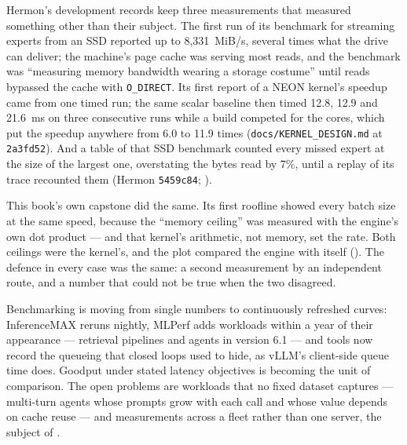 
Hermon's development records keep three measurements that measured something
other than their subject. The first run of its benchmark for streaming experts
from an SSD reported up to 8,331~MiB/s, several times what the drive can
deliver; the machine's page cache was serving most reads, and the benchmark was
``measuring memory bandwidth wearing a storage costume'' until reads bypassed the
cache with \texttt{O\_DIRECT}. Its first report of a NEON kernel's speedup came
from one timed run; the same scalar baseline then timed 12.8, 12.9 and 21.6~ms on
three consecutive runs while a build competed for the cores, which put the
speedup anywhere from 6.0 to 11.9 times (\texttt{docs/KERNEL\_DESIGN.md} at
\texttt{2a3fd52}). And a table of that SSD benchmark counted every missed expert
at the size of the largest one, overstating the bytes read by 7\%, until a
replay of its trace recounted them (Hermon \texttt{5459c84}; ).

This book's own capstone did the same. Its first roofline showed every batch
size at the same speed, because the ``memory ceiling'' was measured with the
engine's own dot product --- and that kernel's arithmetic, not memory, set the
rate. Both ceilings were the kernel's, and the plot compared the engine with
itself (). The defence in every case was the same: a second
measurement by an independent route, and a number that could not be true when
the two disagreed.


Benchmarking is moving from single numbers to continuously refreshed curves:
InferenceMAX reruns nightly, MLPerf adds workloads within a year of their
appearance --- retrieval pipelines and agents in version 6.1 --- and tools now
record the queueing that closed loops used to hide, as vLLM's client-side queue
time does. Goodput under stated latency objectives is becoming the unit of
comparison. The open problems are workloads that no fixed dataset captures ---
multi-turn agents whose prompts grow with each call and whose value depends on
cache reuse --- and measurements across a fleet rather than one server, the
subject of .

\ExercisesSection

